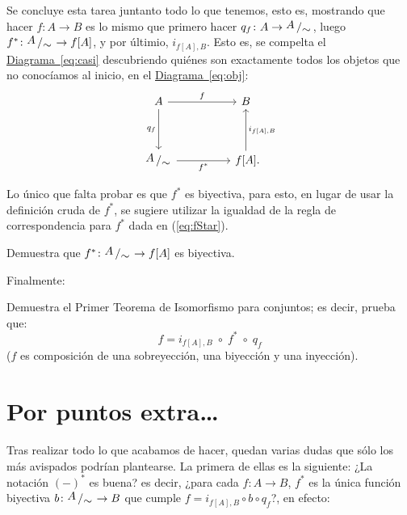 \documentclass[letterpaper,DIV=14,headsepline,12pt]{scrartcl}
\newcommand{\pts}{}
\newenvironment{ejercicio}[1]{\ifthenelse{\equal{#1}{1} \OR
\equal{#1}{+1}}{\renewcommand{\pts}{\textbf{(#1
pt)}}}{\renewcommand{\pts}{\textbf{(#1 pts)}}}\begin{ejj}\upshape
\pts}{\end{ejj}}
\newcommand{\quot}[2]{{\raisebox{.2em}{$#1$}\left/\raisebox{-.2em}{$#2$}\right.}}
\begin{document}
    Se concluye esta tarea juntanto todo lo que tenemos, esto es, mostrando que
    hacer $f\colon A\to B$ es lo mismo que primero hacer $q_f\colon A\to \quot{A}{\sim}$,
    luego $f^*\colon \quot{A}{\sim} \to f[A]$, y por últimio, $i_{f[A],B}$. Esto es,
    se compelta el \hyperref[eq:obj]{Diagrama~\ref*{eq:casi}} descubriendo
    quiénes son exactamente todos los objetos que no conocíamos al inicio, en
    el \hyperref[eq:obj]{Diagrama~\ref*{eq:obj}}:
    \begin{equation}\label{eq:ya}
        \begin{tikzcd}
            A && B \\
            \\
            \quot{A}{\sim} && {f[A]}\mathrlap{.}
            \arrow["f", from=1-1, to=1-3]
            \arrow["q_f"', from=1-1, to=3-1]
            \arrow["f^*"', from=3-1, to=3-3]
            \arrow["{i_{f[A],B}}"', from=3-3, to=1-3]
        \end{tikzcd}
    \end{equation}

    Lo único que falta probar es que $f^*$ es biyectiva, para esto, en lugar de
    usar la definición cruda de $f^*$, se sugiere utilizar la igualdad de la
    regla de correspondencia para $f^*$ dada en (\ref{eq:fStar}).

    \begin{ejercicio}{1}
        Demuestra que $f^*\colon \quot{A}{\sim} \to f[A]$ es biyectiva.
    \end{ejercicio}

    Finalmente:
    \begin{ejercicio}{.5}
        Demuestra el Primer Teorema de Isomorfismo para conjuntos; es decir,
        prueba que:
        \[ f=i_{f[A],B} \; \circ \; f^* \; \circ \; q_f \] ($f$ es composición
        de una sobreyección, una biyección y una inyección).
    \end{ejercicio}

    \section*{Por puntos extra\dots}

    Tras realizar todo lo que acabamos de hacer, quedan varias dudas que sólo
    los más avispados podrían plantearse. La primera de ellas es la siguiente:
    ¿La notación $(-)^*$ es buena? es decir, ¿para cada $f\colon A \to B$, $f^*$ es la
    única función biyectiva $b\colon \quot{A}{\sim}\to B$ que cumple 
    $f=i_{f[A],B} \circ b \circ q_f$?, en efecto:
\end{document}

